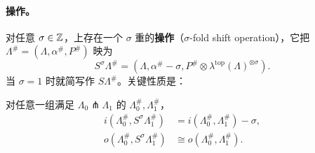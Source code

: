 \paragraph{\trSuspension{}操作。}\label{sub:shift-operation}
对任意 $\sigma\in\mathbb{Z}$，\trLinear\trLagrange\trBrane{}上存在一个 $\sigma$
重的\textbf{\trSuspension{}操作}（$\sigma$-fold shift operation），它把
$\Lambda^\#=(\Lambda,\alpha^\#,P^\#)$ 映为
\begin{equation}\label{eq:shift-operation}
S^\sigma\Lambda^\#=(\Lambda,\alpha^\#-\sigma,
P^\#\otimes\lambda^{\mathrm{top}}(\Lambda)^{\otimes\sigma}).
\end{equation}
当 $\sigma=1$ 时就简写作 $S\Lambda^\#$。关键性质是：
\begin{lemma}\label{thm:shift-index-orientation}
对任意一组满足 $\Lambda_0\pitchfork\Lambda_1$ 的\trLinear\trLagrange\trBrane{}
$\Lambda_0^\#,\Lambda_1^\#$，
\begin{equation}\label{eq:shift-index-orientation}
\begin{aligned}
i(\Lambda_0^\#,S^\sigma\Lambda_1^\#)&=i(\Lambda_0^\#,\Lambda_1^\#)-\sigma,\\
o(\Lambda_0^\#,S^\sigma\Lambda_1^\#)&\cong o(\Lambda_0^\#,\Lambda_1^\#).
\end{aligned}
\end{equation}
\end{lemma}
